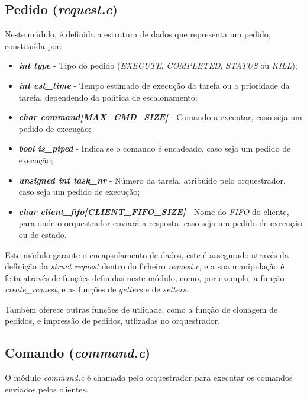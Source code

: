 \documentclass[a4paper,11pt]{scrreprt}
\begin{document}
        \subsection{Pedido (\textit{request.c})}
            Neste módulo, é definida a estrutura de dados que representa um pedido, constituída por:
            \begin{itemize}
                \item \textbf{\textit{int type}} - Tipo do pedido
                    (\textit{EXECUTE}, \textit{COMPLETED}, \textit{STATUS} ou \textit{KILL});
                \item \textbf{\textit{int est\_time}} - Tempo estimado de execução da tarefa
                    ou a prioridade da tarefa, dependendo da política de escalonamento;
                \item \textbf{\textit{char command[MAX\_CMD\_SIZE]}} - Comando a executar, caso seja um pedido de execução;
                \item \textbf{\textit{bool is\_piped}} - Indica se o comando é encadeado, caso seja um pedido de execução;
                \item \textbf{\textit{unsigned int task\_nr}} - Número da tarefa, atribuído pelo orquestrador, caso seja um pedido de execução;
                \item \textbf{\textit{char client\_fifo[CLIENT\_FIFO\_SIZE]}} - Nome do \textit{FIFO} do cliente,
                    para onde o orquestrador enviará a resposta, caso seja um pedido de execução ou de estado.
            \end{itemize}

            Este módulo garante o encapsulamento de dados, este é assegurado através da definição da
            \textit{struct request} dentro do ficheiro \textit{request.c}, e a sua manipulação é feita através
            de funções definidas neste módulo, como, por exemplo, a função \textit{create\_request}, e as funções
            de \textit{getters} e de \textit{setters}.

            Também oferece outras funções de utlidade, como a função de clonagem de pedidos, e impressão de pedidos,
            utlizadas no orquestrador.

        \subsection{Comando (\textit{command.c})}
            O módulo \textit{command.c} é chamado pelo orquestrador para executar os comandos enviados pelos clientes.
\end{document}
